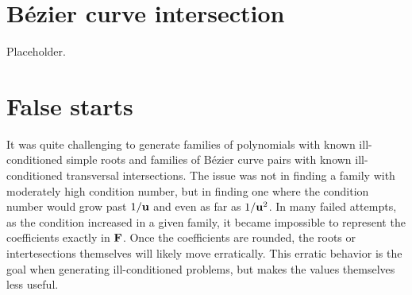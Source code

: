 \section{B\'{e}zier curve intersection}\label{sec:compensated-curve-intersect}

Placeholder.

\section{False starts}\label{sec:false-starts}

It was quite challenging to generate families of polynomials with known
ill-conditioned simple roots and families of B\'{e}zier curve pairs with known
ill-conditioned transversal intersections. The issue was not in finding a
family with moderately high condition number, but in finding one where the
condition number would grow past \(1 / \mathbf{u}\) and even as far as
\(1 / \mathbf{u}^2\). In many failed attempts, as the condition increased
in a given family, it became impossible to represent the
coefficients exactly in \(\mathbf{F}\). Once the coefficients are rounded,
the roots or intertesections themselves will likely move erratically.
This erratic behavior is the goal when generating ill-conditioned problems,
but makes the values themselves less useful.

